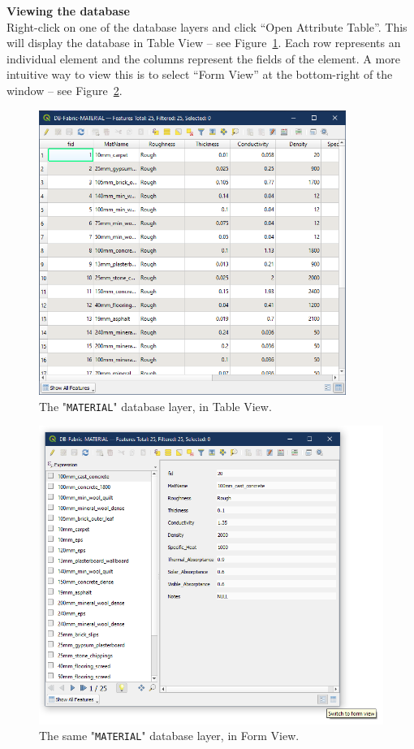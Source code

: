 \documentclass{article}
\begin{document}
\textbf{Viewing the database} \\
Right-click on one of the database layers and click ``Open Attribute Table''. This will display the database in Table View -- see Figure~\ref{fig:db1}. Each row represents an individual element and the columns represent the fields of the element. A more intuitive way to view this is to select ``Form View'' at the bottom-right of the window -- see Figure~\ref{fig:db2}. \\

\begin{figure}[h!]
    \centering
    \includegraphics[width=10cm]{Figures/databaselayer1.png}
    \caption{The "\texttt{MATERIAL}" database layer, in Table View.}
    \label{fig:db1}
\end{figure}
\begin{figure}[h!]
    \centering
    \includegraphics[width=12cm]{Figures/databaselayer2.png}
    \caption{The same "\texttt{MATERIAL}" database layer, in Form View.}
    \label{fig:db2}
\end{figure}
\end{document}
